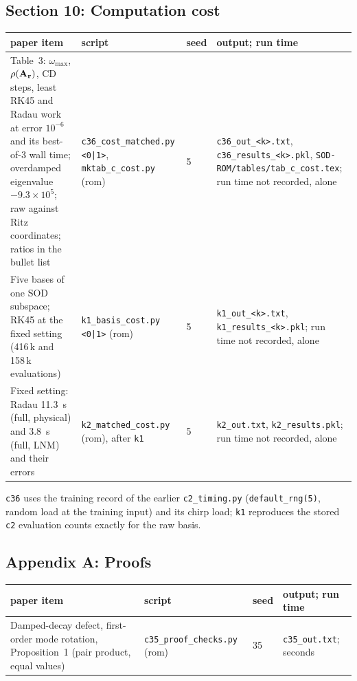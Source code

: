 \documentclass[10pt]{article}
\newcommand{\f}[1]{\texttt{#1}}
\begin{document}
\subsection*{Section 10: Computation cost}
\begin{longtable}{L{0.31\textwidth}L{0.25\textwidth}L{0.08\textwidth}L{0.25\textwidth}}
\toprule
paper item & script & seed & output; run time\\ \midrule
Table~3: $\omega_{\max}$, $\rho(\bf A_r)$, CD steps, least RK45 and Radau work at error $10^{-6}$ and its best-of-3 wall time; overdamped eigenvalue $-9.3\times10^5$; raw against Ritz coordinates; ratios in the bullet list & \f{c36\_\allowbreak{}cost\_\allowbreak{}matched.py <0|1>}, \f{mktab\_\allowbreak{}c\_\allowbreak{}cost.py} (rom) & 5 & \f{c36\_\allowbreak{}out\_\allowbreak{}<k>.txt}, \f{c36\_\allowbreak{}results\_\allowbreak{}<k>.pkl}, \f{SOD-ROM/\allowbreak{}tables/\allowbreak{}tab\_\allowbreak{}c\_\allowbreak{}cost.tex}; run time not recorded, alone\\
Five bases of one SOD subspace; RK45 at the fixed setting (416\,k and 158\,k evaluations) & \f{k1\_\allowbreak{}basis\_\allowbreak{}cost.py <0|1>} (rom) & 5 & \f{k1\_\allowbreak{}out\_\allowbreak{}<k>.txt}, \f{k1\_\allowbreak{}results\_\allowbreak{}<k>.pkl}; run time not recorded, alone\\
Fixed setting: Radau 11.3~s (full, physical) and 3.8~s (full, LNM) and their errors & \f{k2\_\allowbreak{}matched\_\allowbreak{}cost.py} (rom), after \f{k1} & 5 & \f{k2\_\allowbreak{}out.txt}, \f{k2\_\allowbreak{}results.pkl}; run time not recorded, alone\\
\bottomrule
\end{longtable}
\f{c36} uses the training record of the earlier \f{c2\_\allowbreak{}timing.py} (\f{default\_\allowbreak{}rng(5)}, random load at the training input) and its chirp load; \f{k1} reproduces the stored \f{c2} evaluation counts exactly for the raw basis.

\subsection*{Appendix A: Proofs}
\begin{longtable}{L{0.31\textwidth}L{0.25\textwidth}L{0.08\textwidth}L{0.25\textwidth}}
\toprule
paper item & script & seed & output; run time\\ \midrule
Damped-decay defect, first-order mode rotation, Proposition~1 (pair product, equal values) & \f{c35\_\allowbreak{}proof\_\allowbreak{}checks.py} (rom) & 35 & \f{c35\_\allowbreak{}out.txt}; seconds\\
\bottomrule
\end{longtable}
\end{document}

